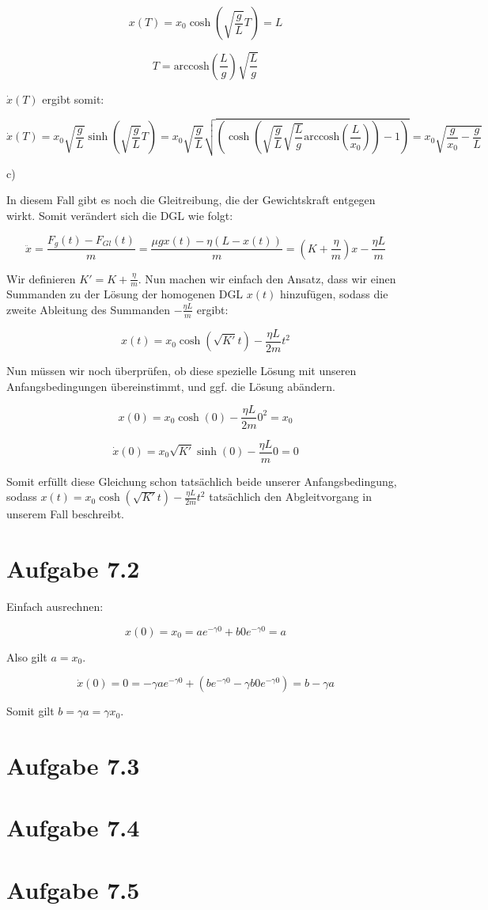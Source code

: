 \documentclass{theozettel}
\begin{document}
$$
x(T) =  x_0 \cosh(\sqrt{\frac{g}{L}} T) = L
$$

$$
T = \text{arccosh}(\frac{L}{g}) \sqrt{\frac{L}{g}}
$$

$\dot{x}(T)$ ergibt somit:

$$
\dot{x}(T) = x_0 \sqrt{\frac{g}{L}} \sinh(\sqrt{\frac{g}{L}} T) = x_0 \sqrt{\frac{g}{L}} \sqrt{(\cosh( \sqrt{\frac{g}{L}} \sqrt{\frac{L}{g}} \text{arccosh}(\frac{L}{x_0})) - 1)} = x_0 \sqrt{\frac{g}{x_0} - \frac{g}{L}}
$$

c) 

In diesem Fall gibt es noch die Gleitreibung, die der Gewichtskraft entgegen wirkt. Somit verändert sich die DGL wie folgt:

$$
\ddot{x} = \frac{F_g(t) - F_{Gl}(t)}{m} = \frac{\mu g x(t) - \eta (L-x(t))}{m} = (K + \frac{\eta}{m}) x - \frac{\eta L}{m}
$$

Wir definieren $K' = K + \frac{\eta}{m}$. Nun machen wir einfach den Ansatz, dass wir einen Summanden zu der Lösung der homogenen DGL $x(t)$ hinzufügen, sodass die zweite Ableitung des Summanden $- \frac{\eta L}{m}$ ergibt:

$$
x(t) = x_0 \cosh(\sqrt{K'} t) - \frac{\eta L}{2 m} t^{2}
$$

Nun müssen wir noch überprüfen, ob diese spezielle Lösung mit unseren Anfangsbedingungen übereinstimmt, und ggf. die Lösung abändern.

$$
x(0) = x_0 \cosh(0) - \frac{\eta L}{2 m} 0^{2} = x_0
$$

$$
\dot{x}(0) = x_0 \sqrt{K'} \sinh(0) - \frac{\eta L}{m} 0 = 0
$$

Somit erfüllt diese Gleichung schon tatsächlich beide unserer Anfangsbedingung, sodass $x(t) = x_0 \cosh(\sqrt{K'} t) - \frac{\eta L}{2 m} t^{2}$ tatsächlich den Abgleitvorgang in unserem Fall beschreibt.


\section*{Aufgabe 7.2} 


Einfach ausrechnen:

$$
x(0) = x_0 = a e^{- \gamma 0} + b 0 e^{- \gamma 0} = a
$$

Also gilt $a = x_0$.

$$
\dot{x}(0) = 0 = - \gamma a e^{- \gamma 0} + (b e^{- \gamma 0} - \gamma b 0 e^{- \gamma 0}) = b - \gamma a
$$

Somit gilt $b = \gamma a = \gamma x_0$.



\section*{Aufgabe 7.3} 



\section*{Aufgabe 7.4} 



\section*{Aufgabe 7.5} 
\end{document}
